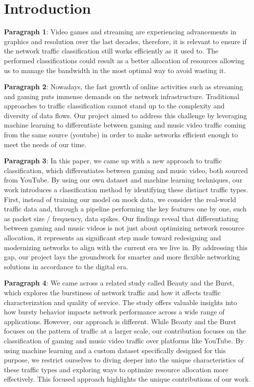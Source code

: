 \section{Introduction}
\label{sec:intro}
 



\textbf{Paragraph 1}: Video games and streaming are experiencing advancements in graphics and resolution over the last decades, therefore, it is relevant to ensure if the network traffic classification still works efficiently as it used to. The performed classifications could result as a better allocation of resources allowing us to manage the bandwidth in the most optimal way to avoid wasting it. 


\textbf{Paragraph 2}: Nowadays, the fast growth of online activities such as streaming and gaming puts immense demands on the network infrastructure. Traditional approaches to traffic classification cannot stand up to the complexity and diversity of data flows. Our project aimed to address this challenge by leveraging machine learning to differentiate between gaming and music video traffic coming from the same source (youtube) in order to make networks efficient enough to meet the needs of our time.


\textbf{Paragraph 3}: In this paper, we came up with a new approach to traffic classification, which differentiates between gaming and music video, both sourced from YouTube. By using our own dataset and machine learning techniques, our work introduces a classification method by identifying these distinct traffic types. First, instead of training our model on mock data, we consider the real-world traffic data and, through a pipeline performing the key features one by one, such as packet size / frequency, data spikes. Our findings reveal that differentiating between gaming and music videos is not just about optimizing network resource allocation, it represents an significant step made toward redesigning and modernizing networks to align with the current era we live in. By addressing this gap, our project lays the groundwork for  smarter and more flexible networking solutions in accordance to the digital era.



\textbf{Paragraph 4}: We came across a related study called Beauty and the Burst, which explores the burstiness of network traffic and how it affects traffic characterization and quality of service. The study offers valuable insights into how bursty behavior impacts network performance across a wide range of applications. However, our approach is different. While Beauty and the Burst focuses on the pattern of traffic at a larger scale, our contribution focuses on the classification of gaming and music video traffic over platforms like YouTube. By using machine learning and a custom dataset specifically designed for this purpose, we restrict ourselves to diving deeper into the unique characteristics of these traffic types and exploring ways to optimize resource allocation more effectively. This focused approach highlights the unique contributions of our work.




